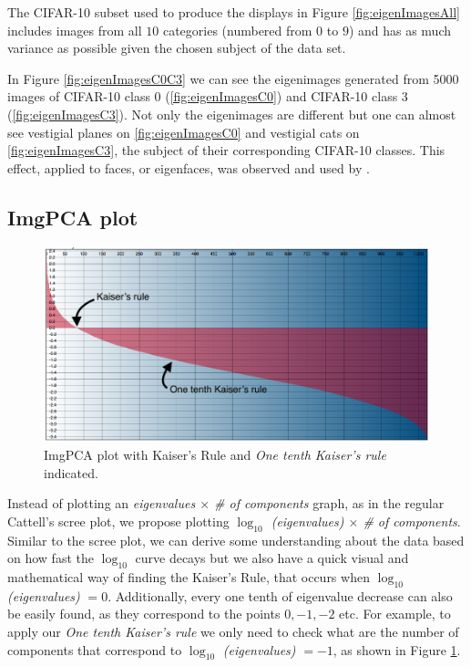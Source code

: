 \documentclass{article} %
\begin{document}
The CIFAR-10 subset used to produce the displays in Figure \ref{fig:eigenImagesAll} includes images from all $10$ categories (numbered from $0$ to $9$) and has as much variance as possible given the chosen subject of the data set.\par In Figure \ref{fig:eigenImagesC0C3} we can see the eigenimages generated from 5000 images of CIFAR-10 class 0 (\ref{fig:eigenImagesC0}) and CIFAR-10 class 3 (\ref{fig:eigenImagesC3}). Not only the eigenimages are different but one can almost see vestigial planes on \ref{fig:eigenImagesC0} and vestigial cats on \ref{fig:eigenImagesC3}, the subject of their corresponding CIFAR-10 classes.
This effect, applied to faces, or eigenfaces, was observed and used by \citet{sirovich1987low}.

\subsection{ImgPCA plot}

\begin{figure}[h]
\begin{center}
\includegraphics[width=\textwidth]{imgPcaKaiserRule.png}
\end{center}
\caption{ImgPCA plot with Kaiser's Rule and \emph{One tenth Kaiser's rule} indicated.}
\label{fig:ImgPCAKaiserAndOTK}
\end{figure}

Instead of plotting an \textit{eigenvalues $\times$  \# of components} graph, as in the regular Cattell's scree plot, we propose plotting \textit{$\log_{10}$ (eigenvalues) $\times$ \# of components}. Similar to the scree plot, we can derive some understanding about the data based on how fast the $\log_{10}$ curve decays but we also have a quick visual and mathematical way of finding the Kaiser's Rule, that occurs when $\log_{10}$ \emph{(eigenvalues)} $= 0$. Additionally, every one tenth of eigenvalue decrease can also be easily found, as they correspond to the points $0, -1, -2$ etc. For example, to apply our \emph{One tenth Kaiser's rule} we only need to check what are the number of components that correspond to $\log_{10}$ \emph{(eigenvalues)} $= -1$, as shown in Figure \ref{fig:ImgPCAKaiserAndOTK}.
\end{document}
